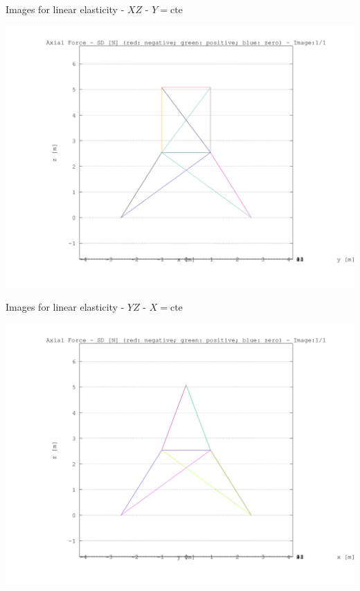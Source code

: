 \documentclass[a4paper,11pt]{article}
\begin{document}
\begin{center}       
Images for linear elasticity -  $XZ$ - $Y=\text{cte}$ 

\includegraphics[width=.80\textwidth]{../../XY_XZ_YZ/XZ/axial_force/torre_axial_force_XZ_1.png}      

\end{center}       
\newpage       
\begin{center}       
Images for linear elasticity -  $YZ$ - $X=\text{cte}$ 

\includegraphics[width=.80\textwidth]{../../XY_XZ_YZ/YZ/axial_force/torre_axial_force_YZ_1.png}      

\end{center}       
\end{document}
